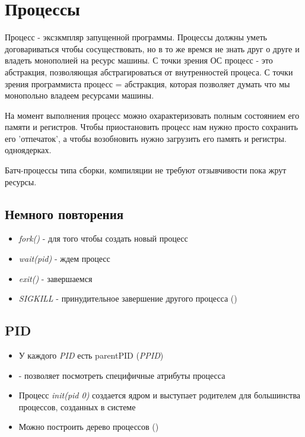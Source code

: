 \documentclass[../lectures.tex]{subfiles}
\begin{document}
\chapter{Процессы}

Процесс - эксзкмпляр запущенной программы. Процессы должны уметь договариваться
чтобы сосуществовать, но в то же времся не знать друг о друге и владеть
монополией на ресурс машины. С точки зрения ОС процесс - это абстракция,
позволяющая абстрагироваться от внутренностей процеса. С точки зрения
программиста процесс = абстракция, которая позволяет думать что мы монопольно
владеем ресурсами машины.

На момент выполнения процесс можно охарактеризовать полным состоянием его памяти
и регистров. Чтобы приостановить процесс нам нужно просто сохранить его
'отпечаток', а чтобы возобновить нужно загрузить его память и регистры.
одноядерках.

Батч-процессы типа сборки, компиляции не требуют отзывчивости пока жрут ресурсы.


\section{Немного повторения}

\begin{itemize}
    \item \emph{fork()} - для того чтобы создать новый процесс
    \item \emph{wait(pid)} - ждем процесс
    \item \emph{exit()} - завершаемся
    \item \emph{SIGKILL} - принудительное завершение другого процесса ()
\end{itemize}

\section{PID}

\begin{itemize}
    \item У каждого \emph{PID} есть parentPID (\emph{PPID})

    \item {} - позволяет посмотреть специфичные атрибуты процесса

    \item Процесс \emph{init(pid 0)} создается ядром и выступает родителем для большинства процессов, созданных в системе

    \item Можно построить дерево процессов ()
\end{itemize}
\end{document}
